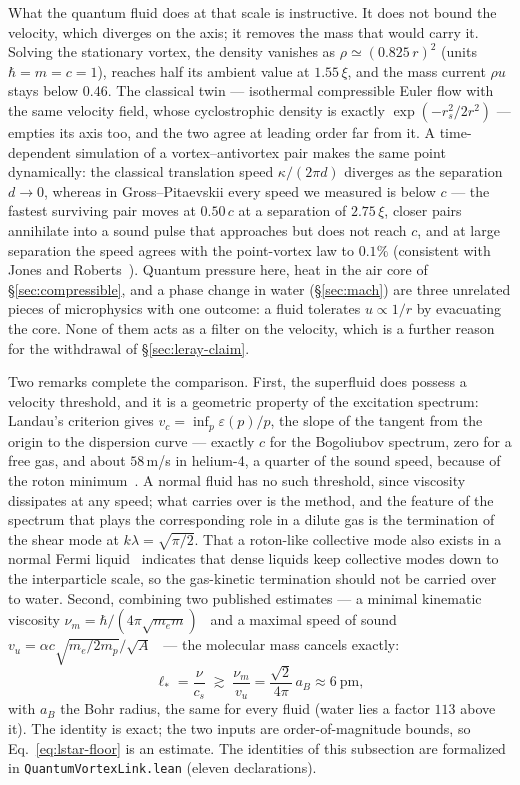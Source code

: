 \documentclass[11pt,a4paper]{article}
\begin{document}
What the quantum fluid does at that scale is instructive. It does not bound the velocity, which
diverges on the axis; it removes the mass that would carry it. Solving the stationary vortex, the
density vanishes as $\rho\simeq(0.825\,r)^2$ (units $\hbar=m=c=1$), reaches half its ambient value at
$1.55\,\xi$, and the mass current $\rho u$ stays below $0.46$. The classical twin --- isothermal
compressible Euler flow with the same velocity field, whose cyclostrophic density is exactly
$\exp(-r_s^2/2r^2)$ --- empties its axis too, and the two agree at leading order far from it. A
time-dependent simulation of a vortex--antivortex pair makes the same point dynamically: the classical
translation speed $\kappa/(2\pi d)$ diverges as the separation $d\to0$, whereas in Gross--Pitaevskii
every speed we measured is below $c$ --- the fastest surviving pair moves at $0.50\,c$ at a separation
of $2.75\,\xi$, closer pairs annihilate into a sound pulse that approaches but does not reach $c$,
and at large separation the speed agrees with the point-vortex law to $0.1\%$ (consistent with Jones and
Roberts~\cite{JonesRoberts1982}). Quantum pressure here, heat in the air core of
\S\ref{sec:compressible}, and a phase change in water (\S\ref{sec:mach}) are three unrelated pieces of
microphysics with one outcome: a fluid tolerates $u\propto1/r$ by evacuating the core. None of them acts
as a filter on the velocity, which is a further reason for the withdrawal of \S\ref{sec:leray-claim}.

Two remarks complete the comparison. First, the superfluid does possess a velocity threshold, and it
is a geometric property of the excitation spectrum: Landau's criterion gives
$v_c=\inf_p\varepsilon(p)/p$, the slope of the tangent from the origin to the dispersion curve --- exactly
$c$ for the Bogoliubov spectrum, zero for a free gas, and about $58$\,m/s in helium-4, a quarter of the
sound speed, because of the roton minimum~\cite{GodfrinKrotscheck2022}. A normal fluid has no such
threshold, since viscosity dissipates at any speed; what carries over is the method, and the feature of
the spectrum that plays the corresponding role in a dilute gas is the termination of the shear mode at
$k\lambda=\sqrt{\pi/2}$. That a roton-like collective mode also exists in a normal Fermi
liquid~\cite{Godfrin2012} indicates that dense liquids keep collective modes down to the interparticle
scale, so the gas-kinetic termination should not be carried over to water. Second, combining two
published estimates --- a minimal kinematic viscosity
$\nu_m=\hbar/(4\pi\sqrt{m_em})$~\cite{TrachenkoBrazhkin2020} and a maximal speed of sound
$v_u=\alpha c\sqrt{m_e/2m_p}/\sqrt A$~\cite{Trachenko2020sound} --- the molecular mass cancels exactly:
\begin{equation}
  \ell_*=\frac{\nu}{c_s}\;\gtrsim\;\frac{\nu_m}{v_u}=\frac{\sqrt2}{4\pi}\,a_B\approx6\ \text{pm},
  \label{eq:lstar-floor}
\end{equation}
with $a_B$ the Bohr radius, the same for every fluid (water lies a factor $113$ above it). The identity is
exact; the two inputs are order-of-magnitude bounds, so Eq.~\eqref{eq:lstar-floor} is an estimate. The
identities of this subsection are formalized in \texttt{QuantumVortexLink.lean} (eleven declarations).
\end{document}
